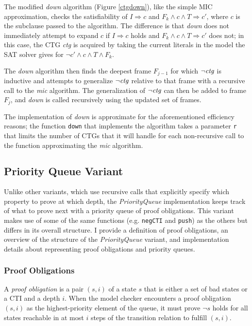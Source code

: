 \documentclass[12pt,a4paper,twoside,openright]{report}
\begin{document}
{{The modified {\it down} algorithm (Figure \ref{ctgdown}), like the simple MIC approximation,
checks the satisfiability of
$I \Rightarrow c$ and $F_k \wedge c \wedge T \Rightarrow c'$, where $c$ is the subclause passed to
the algorithm.
The difference is that {\it down} does not immediately attempt to expand $c$
if $I \Rightarrow c$ holds and $F_k \wedge c \wedge T \Rightarrow c'$ does
not; in this case, the CTG {\it ctg} is acquired by taking the current literals in
the model the SAT solver gives for $\neg c' \wedge c \wedge T \wedge F_k$.

The {\it down} algorithm then finds the deepest frame $F_{j - 1}$ for which $\neg {\it ctg}$ is inductive
and attempts to generalize $\neg {\it ctg}$ relative to that frame with a recursive call to the
{\it mic} algorithm. The generalization of $\neg {\it ctg}$ can then be added to frame $F_j$,
and {\it down} is called recursively using the updated set of frames.

The implementation of {\it down} is approximate for the aforementioned efficiency
reasons; the function \verb,down, that implements
the algorithm takes a parameter \verb,r, that limits the number of CTGs that it will handle for
each non-recursive call to the function approximating the {\it mic} algorithm.

\subsection{Priority Queue Variant}
\label{pqueue}
Unlike other variants, which use recursive calls that explicitly specify which property
to prove at which depth, the \emph{PriorityQueue} implementation keeps track of what
to prove next with a priority queue of proof obligations.
This variant makes
use of some of the same functions (e.g. \verb,negCTI, and \verb,push,) as the others but
differs in its overall structure.
I provide a definition of proof obligations, an
overview of the structure of the \emph{PriorityQueue} variant,
and implementation details about representing proof obligations and priority queues.

\subsubsection{Proof Obligations}
A \emph{proof obligation} is a pair $(s,i)$ of a state $s$ that is either a set of bad states
or a CTI and a depth $i$. When the model checker encounters a proof obligation
$(s,i)$ as the highest-priority element of the queue, it must prove $\neg s$ holds for all states
reachable in at most $i$ steps of the transition relation to fulfill
$(s, i)$.

}}
\end{document}
